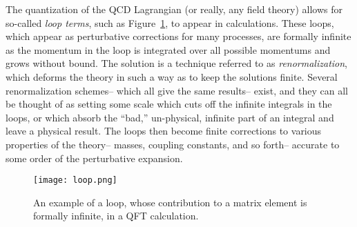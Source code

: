 The quantization of the QCD Lagrangian (or really, any field theory) allows for so-called \textit{loop terms}, such as Figure~\ref{fig:sm:loop}, to appear in calculations. These loops, which appear as perturbative corrections for many processes, are formally infinite as the momentum in the loop is integrated over all possible momentums and grows without bound. The solution is a technique referred to as \textit{renormalization}, which deforms the theory in such a way as to keep the solutions finite. Several renormalization schemes-- which all give the same results-- exist, and they can all be thought of as setting some scale which cuts off the infinite integrals in the loops, or which absorb the ``bad,'' un-physical, infinite part of an integral and leave a physical result. The loops then become finite corrections to various properties of the theory-- masses, coupling constants, and so forth-- accurate to some order of the perturbative expansion.


\begin{figure}
\centering
\texttt{[image: loop.png]}
\label{fig:sm:loop}
\caption{An example of a loop, whose contribution to a matrix element is formally infinite, in a QFT calculation.}
\end{figure}


